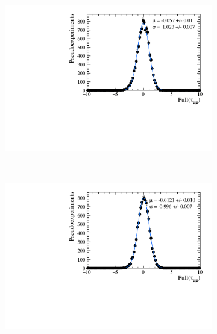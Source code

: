 \begin{figure}[htbp]
    \centering
   \begin{subfigure}[b]{0.48\textwidth}
        \includegraphics[width= \textwidth]{./Figs/LifetimeMeasurement/50fb_simple_tau_pull.pdf}
    \end{subfigure}
   ~ %
    \begin{subfigure}[b]{0.48\textwidth}
       \includegraphics[width=\textwidth]{./Figs/LifetimeMeasurement/300fb_simple_tau_pull.pdf}

\end{subfigure}
\end{figure}
